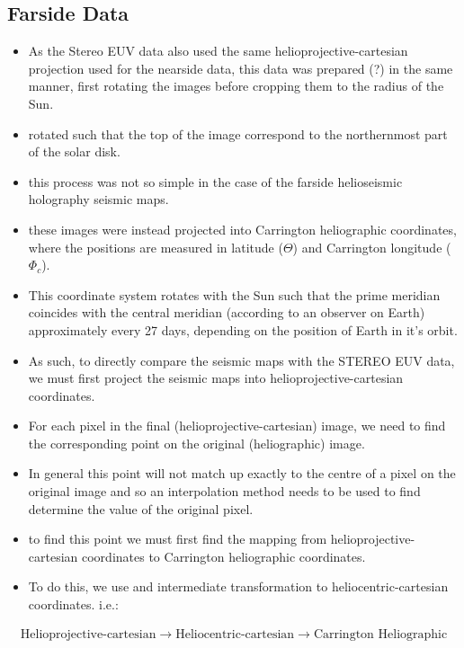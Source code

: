 \documentclass[11pt,a4paper,onecolumn]{report}
\begin{document}
\subsection{Farside Data}
\begin{itemize}
  \item As the Stereo EUV data also used the same helioprojective-cartesian
  projection used for the nearside data, this data was prepared (?) in the same
  manner, first rotating the images before cropping them to the radius of the
  Sun.
  \item rotated such that the top of the image correspond to the northernmost part
  of the solar disk.
  \item this process was not so simple in the case of the farside helioseismic
  holography seismic maps.
  \item these images were instead projected into Carrington heliographic
  coordinates, where the positions are measured in latitude (\(\Theta\)) and
  Carrington longitude (\(\Phi_c\)).
  \item This coordinate system rotates with the Sun such that the prime meridian
  coincides with the central meridian (according to an observer on Earth)
  approximately every 27 days, depending on the position of Earth in it's orbit.
  \item As such, to directly compare the seismic maps with the STEREO EUV
  data, we must first project the seismic maps into helioprojective-cartesian
  coordinates.

  \item For each pixel in the final (helioprojective-cartesian) image, we need
  to find the corresponding point on the original (heliographic) image.
  \item In general this point will not match up exactly to the centre of a pixel
  on the original image and so an interpolation method needs to be used to find
  determine the value of the original pixel.
  \item to find this point we must first find the mapping from
  helioprojective-cartesian coordinates to Carrington heliographic coordinates.
  \item To do this, we use and intermediate transformation to
  heliocentric-cartesian coordinates. i.e.:
\end{itemize}

\begin{align*}
  \text{Helioprojective-cartesian} \rightarrow \text{Heliocentric-cartesian} \rightarrow \text{Carrington Heliographic}
\end{align*}
\end{document}
